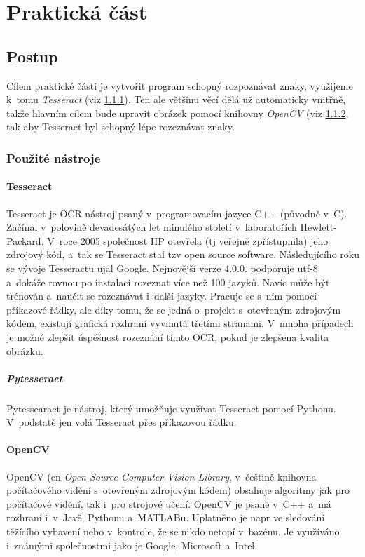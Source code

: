 \documentclass[12pt,oneside]{report}			%
\begin{document}
	\part{Praktická část}
	\chapter{Postup}
	Cílem praktické části je vytvořit program schopný rozpoznávat znaky, využijeme k~tomu \emph{Tesseract} (\gls{viz} \ref{sec:Tesseract}). Ten ale většinu věcí dělá už automaticky vnitřně, takže hlavním cílem bude upravit obrázek pomocí knihovny \emph{OpenCV} (\gls{viz} \ref{sec:OpenCV}, tak aby Tesseract byl schopný lépe rozeznávat znaky.
	
	\section{Použité nástroje}
	\label{sec:used}
	\subsection{Tesseract}
	\label{sec:Tesseract}
	Tesseract je \gls{OCR} nástroj psaný v~programovacím jazyce C++ (původně v~C).  Začínal v~polovině devadesátých let minulého století v~laboratořích Hewlett-Packard. V~roce 2005 společnost HP otevřela (\gls{tj} veřejně zpřístupnila) jeho zdrojový kód, a~tak se Tesseract stal \gls{tzv} open source software. Následujícího roku se vývoje Tesseractu ujal Google. Nejnovější verze 4.0.0. podporuje \gls{utf-8} a~dokáže rovnou po instalaci rozeznat více než 100 jazyků. Navíc může být trénován a~naučit se rozeznávat i~další jazyky. Pracuje se s~ním pomocí příkazové řádky, ale díky tomu, že se jedná o~projekt s~otevřeným zdrojovým kódem, existují grafická rozhraní vyvinutá třetími stranami. V~mnoha případech je možné zlepšit úspěšnost rozeznání tímto OCR, pokud je zlepšena kvalita obrázku. \parencite{tesseract_wiki}
	\subsubsection{Pytesseract}
	\label{sec:pytesseract}
	Pytessearact je nástroj, který umožňuje využívat Tesseract pomocí Pythonu. V~podstatě jen volá Tesseract přes příkazovou řádku. \parencite{pytesseract}
	\subsection{OpenCV}
	\label{sec:OpenCV}	
	OpenCV (\gls{en} \emph{Open Source Computer Vision Library}, v~češtině knihovna počítačového vidění s~otevřeným zdrojovým kódem) \parencite{opencv_library} obsahuje algoritmy jak pro počítačové vidění, tak i~pro strojové učení. OpenCV je psané v~C++ a~má rozhraní i~v~Javě, Pythonu a~MATLABu. Uplatněno je \gls{napr} ve sledování těžícího vybavení nebo v~kontrole, že se nikdo netopí v~bazénu. Je využíváno i~známými společnostmi jako je Google, Microsoft a~Intel. \parencite{opencv_about}
\end{document}
